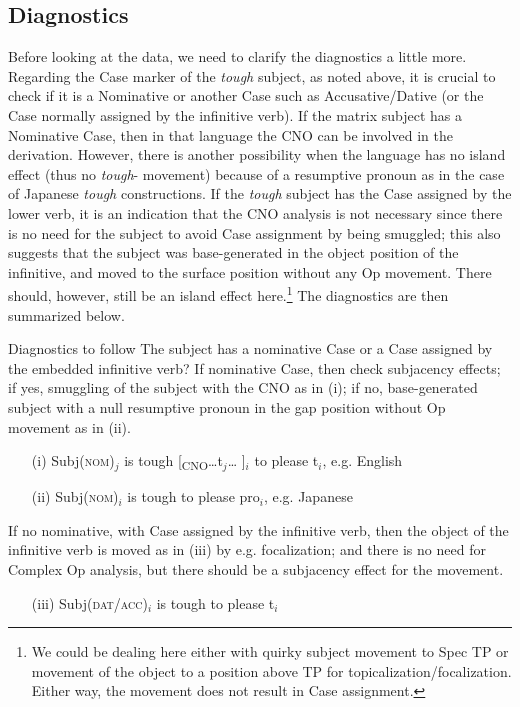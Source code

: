 \documentclass[output=paper,colorlinks,citecolor=brown,
]{langscibook}
\begin{document}
\subsection{Diagnostics} \label{s3.1ha}
Before looking at the data, we need to clarify the diagnostics a little more. Regarding the Case marker of the \textit{tough} subject, as noted above, it is crucial to check if it is a Nominative or another Case such as Accusative/Dative (or the Case normally assigned by the infinitive verb). If the matrix subject has a Nominative Case, then in that language the CNO can be involved in the derivation. However, there is another possibility when the language has no island effect (thus no \textit{tough}- movement) because of a resumptive pronoun as in the case of Japanese \textit{tough} constructions. If the \textit{tough} subject has the Case assigned by the lower verb, it is an indication that the CNO analysis is not necessary since there is no need for the subject to avoid Case assignment by being smuggled; this also suggests that the subject was base-generated in the object position of the infinitive, and moved to the surface position without any Op movement. There should, however, still be an island effect here.\footnote{We could be dealing here either with quirky subject movement to Spec TP or movement of the object to a position above TP for topicalization/focalization. Either way, the movement does not result in Case assignment.} The diagnostics are then summarized below.

\begin{exe}
\ex \label{16ha}Diagnostics to follow
    \ea The subject has a nominative Case or a Case assigned by the embedded infinitive verb?
    \ex If nominative Case, then check subjacency effects; if yes, smuggling of the subject with the CNO as in (i); if no, base-generated subject with a null resumptive pronoun in the gap position without Op movement as in (ii).
    \begin{enumerate}
    \item[(i)] Subj(\textsc{nom})$_{j}$ is tough [\textsubscript{CNO}…t$_{j}$… ]$_{i}$ to please t$_{i}$, e.g. English
    \item[(ii)] Subj(\textsc{nom})$_{i}$ is tough to please pro$_{i}$, e.g. Japanese
    \end{enumerate}
    \ex If no nominative, with Case assigned by the infinitive verb, then the object of the infinitive verb is moved as in (iii) by e.g. focalization; and there is no need for Complex Op analysis, but there should be a subjacency effect for the movement.
    \begin{enumerate}
    \item[(iii)] Subj(\textsc{dat/acc})$_{i}$ is tough to please t$_{i}$                        
    \end{enumerate}
\z
\end{exe}
\end{document}
